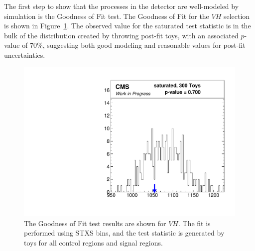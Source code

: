 The first step to show that the processes in the detector are well-modeled
by simulation is the Goodness of Fit test.
The Goodness of Fit for the $V\!H$ selection is shown in Figure~\ref{fig:vh-gof}.
The observed value for the saturated test statistic is in the bulk of the distribution created by throwing
post-fit toys, with an associated $p$-value of 70\%, suggesting both good modeling and
reasonable values for post-fit uncertainties. 
%
\begin{figure}
  \centering
  \includegraphics[width=0.65\linewidth]{figures/210308_STXSfine_400split_Xbb_8f854f5a_inclusive_gof/Gof_inclusive_.pdf}
  \caption[Goodness of Fit for $V\!H$]{
    The Goodness of Fit test results are shown for $V\!H$.
    The fit is performed using STXS bins,
    and the test statistic is generated by toys for all control regions and signal regions.
  }
  \label{fig:vh-gof}
\end{figure}

